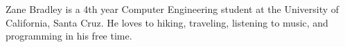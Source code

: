 \documentclass[12pt,journal,compsoc]{IEEEtran}
\begin{document}
\begin{IEEEbiographynophoto}{Zane Bradley}
is a 4th year Computer Engineering student at the University of California, Santa Cruz. He loves to hiking, traveling, listening to music, and programming in his free time.
\end{IEEEbiographynophoto}








\end{document}
